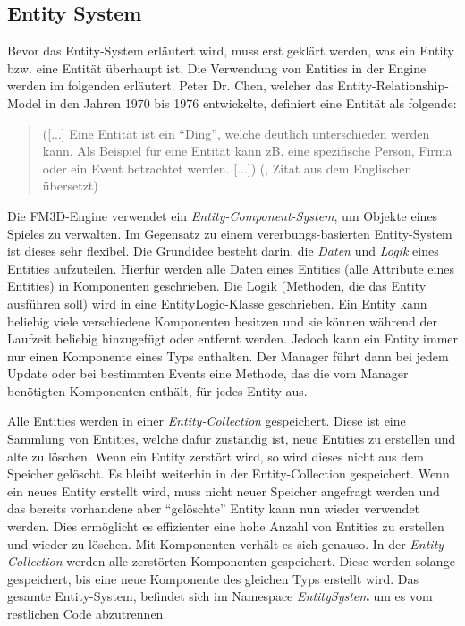 \subsection{Entity System}
\label{entitysystem}
Bevor das Entity-System erläutert wird, muss erst geklärt werden, was ein Entity bzw. eine Entität überhaupt ist. Die Verwendung von Entities in der Engine werden im folgenden erläutert.
Peter Dr. Chen, welcher das Entity-Relationship-Model in den Jahren 1970 bis 1976 entwickelte, definiert eine Entität als folgende:
\begin{quote}
	([...] Eine Entität ist ein "`Ding"', welche deutlich unterschieden werden kann. Als Beispiel für eine Entität kann zB. eine spezifische Person, Firma oder ein Event betrachtet werden. [...])
	(\cite{entityrelationshipmodel}, Zitat aus dem Englischen übersetzt)
\end{quote}
Die FM3D-Engine verwendet ein \textit{Entity-Component-System}, um Objekte eines Spieles zu verwalten. Im Gegensatz zu einem vererbungs-basierten Entity-System ist dieses sehr flexibel. 
Die Grundidee besteht darin, die \textit{Daten} und \textit{Logik} eines Entities aufzuteilen. Hierfür werden alle Daten eines Entities (alle Attribute eines Entities) in Komponenten geschrieben. %
Die Logik (Methoden, die das Entity ausführen soll) wird in eine EntityLogic-Klasse geschrieben. 
Ein Entity kann beliebig viele verschiedene Komponenten besitzen und sie können während der Laufzeit beliebig hinzugefügt oder entfernt werden. Jedoch kann ein Entity immer nur einen Komponente eines Typs enthalten. 
Der Manager führt dann bei jedem Update oder bei bestimmten Events eine Methode, das die vom Manager benötigten Komponenten enthält, für jedes Entity aus.

Alle Entities werden in einer \textit{Entity-Collection} gespeichert. Diese ist eine Sammlung von Entities, welche dafür zuständig ist, neue Entities zu erstellen und alte zu löschen. Wenn ein Entity zerstört wird, so wird dieses nicht aus dem Speicher gelöscht. Es bleibt weiterhin in der Entity-Collection gespeichert. 
Wenn ein neues Entity erstellt wird, muss nicht neuer Speicher angefragt werden und das bereits vorhandene aber "`gelöschte"' Entity kann nun wieder verwendet werden. Dies ermöglicht es effizienter eine hohe Anzahl von Entities zu erstellen und wieder zu löschen. 
Mit Komponenten verhält es sich genauso. In der \textit{Entity-Collection} werden alle zerstörten Komponenten gespeichert. Diese werden solange gespeichert, bis eine neue Komponente des gleichen Typs erstellt wird. Das gesamte Entity-System, befindet sich im Namespace \textit{EntitySystem} um es vom restlichen Code abzutrennen.

